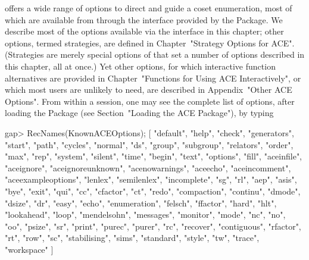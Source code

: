 

{\ACE} offers a wide range of options to  direct  and  guide  a  coset
enumeration, most of which  are  available  from  {\GAP}  through  the
interface provided by the {\ACE} Package.  We  describe  most  of  the
options available via the interface in this  chapter;  other  options,
termed strategies, are defined in Chapter~"Strategy Options for  ACE".
(Strategies are merely special options of {\ACE} that set a number  of
options described in this chapter, all at once.)  Yet  other  options,
for  which  interactive  function   alternatives   are   provided   in
Chapter~"Functions for Using ACE Interactively", or which most  {\GAP}
users are unlikely to  need,  are  described  in  Appendix~"Other  ACE
Options". From within a {\GAP} session, one may see the complete  list
of  {\ACE}  options,   after   loading   the   {\ACE}   Package   (see
Section~"Loading the ACE Package"), by typing

\beginexample
gap> RecNames(KnownACEOptions);
[ "default", "help", "check", "generators", "start", "path", "cycles", 
  "normal", "ds", "group", "subgroup", "relators", "order", "max", "rep", 
  "system", "silent", "time", "begin", "text", "options", "fill", 
  "aceinfile", "aceignore", "aceignoreunknown", "acenowarnings", "aceecho", 
  "aceincomment", "aceexampleoptions", "lenlex", "semilenlex", "incomplete", 
  "sg", "rl", "aep", "asis", "bye", "exit", "qui", 
  "cc", "cfactor", "ct", "redo", "compaction", "continu", "dmode", "dsize", 
  "dr", "easy", "echo", "enumeration", "felsch", "ffactor", "hard", 
  "hlt", "lookahead", "loop", "mendelsohn", "messages", "monitor",
  "mode", "nc", "no", "oo", "psize", "sr", "print", "purec", 
  "purer", "rc", "recover", "contiguous", "rfactor", "rt", "row", "sc", 
  "stabilising", "sims", "standard", "style", "tw",
  "trace", "workspace" ]

\endexample

